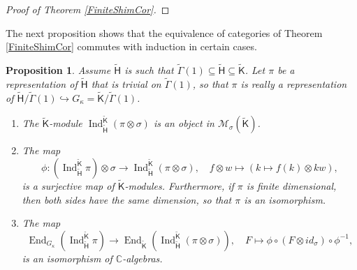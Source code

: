 \documentclass[10pt, letterpaper]{amsart}
\theoremstyle{plain}
\newtheorem{Prop}[equation]{Proposition}
\theoremstyle{definition}
\numberwithin{equation}{section}
\newcommand{\Gammaft}{\widetilde{\mathsf{\Gamma}}}
\newcommand{\Ind}{\operatorname{Ind}}
\newcommand{\End}{\operatorname{End}}
\newcommand{\Hom}{\operatorname{Hom}}
\newcommand{\Kf}{\mathsf{K}}
\newcommand{\Gammaf}{\mathsf{\Gamma}}
\newcommand{\Hft}{\widetilde{\mathsf{H}}}
\newcommand{\Kft}{\widetilde{\mathsf{K}}}
\begin{document}
\begin{proof}[Proof of Theorem \ref{FiniteShimCor}]

    
\end{proof}

The next proposition shows that the equivalence of categories of Theorem \ref{FiniteShimCor} commutes with induction in certain cases.

\begin{Prop}\label{SCInd}
Assume $\Hft$ is such that $\Gammaft(1)\subseteq\Hft\subseteq\Kft$. Let $\pi$ be a representation of $\Hft$ that is trivial on $\widetilde{{\Gammaf}}(1)$, so that $\pi$ is really a representation of $\Hft/\widetilde{{\Gammaf}}(1)\hookrightarrow G_{\kappa}=\Kft\slash\Gammaft(1)$.
	\begin{enumerate}
		\item The $\widetilde{{\Kf}}$-module $\Ind_{\Hft}^{\widetilde{{\Kf}}}(\pi\otimes\sigma)$ is an object in $\mathcal{M}_{\sigma}(\widetilde{{\Kf}})$.\label{IndInCat}
		\item The map 
        \[
        \phi:\left(\Ind_{\Hft}^{\widetilde{{\Kf}}}\pi\right)\otimes \sigma\longrightarrow \Ind_{\Hft}^{\widetilde{{\Kf}}}(\pi\otimes \sigma),\quad f\otimes w\mapsto (k\mapsto f(k)\otimes kw),
        \]
        is a surjective map of $\widetilde{{\Kf}}$-modules. Furthermore, if $\pi$ is finite dimensional, then both sides have the same dimension, so that $\pi$ is an isomorphism.\label{IndSigIso}
		\item The map 
        \[\End_{G_{\kappa}}(\Ind_{\Hft}^{\widetilde{{\Kf}}}\pi)\rightarrow \End_{\widetilde{{\Kf}}}(\Ind_{\Hft}^{\widetilde{{\Kf}}}(\pi\otimes \sigma)),\quad F\mapsto \phi\circ(F\otimes id_{\sigma})\circ \phi^{-1},
        \]
        is an isomorphism of $\mathbb{C}$-algebras. \label{EndIso}
	\end{enumerate}
\end{Prop}
\end{document}

